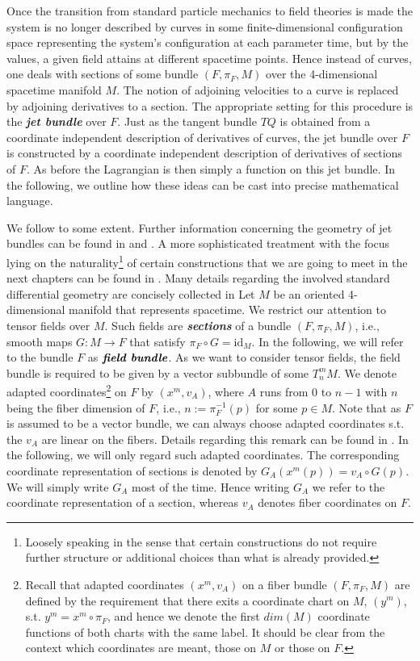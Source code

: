 \documentclass[a4paper,12pt, DIV=14, BCOR=5mm, twoside, headsepline, numbers=noenddot]{scrbook}
\begin{document}
Once the transition from standard particle mechanics to field theories is made the system is no longer described by curves in some finite-dimensional configuration space representing the system's configuration at each parameter time, but by the values, a given field attains at different spacetime points. Hence instead of curves, one deals with sections of some bundle $(F,\pi_F,M)$ over the 4-dimensional spacetime manifold $M$. The notion of adjoining velocities to a curve is replaced by adjoining derivatives to a section. The appropriate setting for this procedure is the \textit{\textbf{jet bundle}} over $F$. Just as the tangent bundle $TQ$ is obtained from a coordinate independent description of derivatives of curves, the jet bundle over $F$ is constructed by a coordinate independent description of derivatives of sections of $F$. As before the Lagrangian is then simply a function on this jet bundle. 
In the following, we outline how these ideas can be cast into precise mathematical language. 

We follow \cite{1998physics...1019G} to some extent. Further information concerning the geometry of jet bundles can be found in \cite{saunders_1989} and \cite{seiler2009involution}. A more sophisticated treatment with the focus lying on the naturality\footnote{Loosely speaking in the sense that certain constructions do not require further structure or additional choices than what is already provided.} of certain constructions that we are going to meet in the next chapters can be found in \cite{kolar1993natural}. Many details regarding the involved standard differential geometry are concisely collected in \cite{doi:10.1142/3867}  Let $M$ be an oriented 4-dimensional manifold that represents spacetime. We restrict our attention to tensor fields over $M$. Such fields are \textit{\textbf{sections}} of a bundle $(F,\pi_F,M)$, i.e., smooth maps $G : M \rightarrow F $ that satisfy $\pi_F \circ G = \mathrm{id}_M$. In the following, we will refer to the bundle $F$ as $\textit{\textbf{field bundle}}$.  As we want to consider tensor fields, the field bundle is required to be given by a vector subbundle of some $T^m_n M$. We denote adapted coordinates\footnote{Recall that adapted coordinates $(x^m,v_A)$ on a fiber bundle $(F, \pi_F, M)$ are defined by the requirement that there exits a coordinate chart on $M$, $(y^m)$, s.t. $y^m = x^m \circ \pi_F$, and hence we denote the first $dim(M)$ coordinate functions of both charts with the same label. It should be clear from the context which coordinates are meant, those on $M$ or those on $F$.} on $F$ by $(x^m,v_A)$, where $A$ runs from $0$ to $n - 1$ with $n$ being the fiber dimension of $F$, i.e., $n := \pi_F^{-1}(p)$ for some $p \in M$. Note that as $F$ is assumed to be a vector bundle, we can always choose adapted coordinates s.t. the $v_A$ are linear on the fibers. Details regarding this remark can be found in \cite{saunders_1989}. In the following, we will only regard such adapted coordinates. The corresponding coordinate representation of sections is denoted by $G_A(x^m(p)) = v_A \circ G (p)$. We will simply write $G_A$ most of the time. Hence writing $G_A$ we refer to the coordinate representation of a section, whereas $v_A$ denotes fiber coordinates on $F$.
\end{document}
